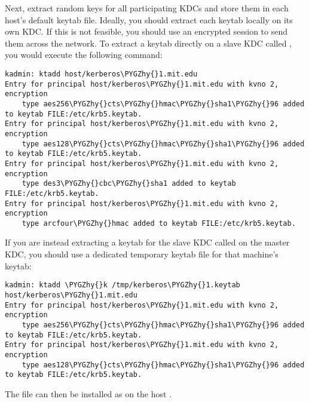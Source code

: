 \documentclass[letterpaper,10pt,english]{sphinxmanual}
\def\PYGZhy{\char`\-}
\begin{document}
Next, extract  random keys for all participating KDCs and
store them in each host's default keytab file.  Ideally, you should
extract each keytab locally on its own KDC.  If this is not feasible,
you should use an encrypted session to send them across the network.
To extract a keytab directly on a slave KDC called
, you would execute the following command:

\begin{Verbatim}[commandchars=\\\{\}]
kadmin: ktadd host/kerberos\PYGZhy{}1.mit.edu
Entry for principal host/kerberos\PYGZhy{}1.mit.edu with kvno 2, encryption
    type aes256\PYGZhy{}cts\PYGZhy{}hmac\PYGZhy{}sha1\PYGZhy{}96 added to keytab FILE:/etc/krb5.keytab.
Entry for principal host/kerberos\PYGZhy{}1.mit.edu with kvno 2, encryption
    type aes128\PYGZhy{}cts\PYGZhy{}hmac\PYGZhy{}sha1\PYGZhy{}96 added to keytab FILE:/etc/krb5.keytab.
Entry for principal host/kerberos\PYGZhy{}1.mit.edu with kvno 2, encryption
    type des3\PYGZhy{}cbc\PYGZhy{}sha1 added to keytab FILE:/etc/krb5.keytab.
Entry for principal host/kerberos\PYGZhy{}1.mit.edu with kvno 2, encryption
    type arcfour\PYGZhy{}hmac added to keytab FILE:/etc/krb5.keytab.
\end{Verbatim}

If you are instead extracting a keytab for the slave KDC called
 on the master KDC, you should use a dedicated
temporary keytab file for that machine's keytab:

\begin{Verbatim}[commandchars=\\\{\}]
kadmin: ktadd \PYGZhy{}k /tmp/kerberos\PYGZhy{}1.keytab host/kerberos\PYGZhy{}1.mit.edu
Entry for principal host/kerberos\PYGZhy{}1.mit.edu with kvno 2, encryption
    type aes256\PYGZhy{}cts\PYGZhy{}hmac\PYGZhy{}sha1\PYGZhy{}96 added to keytab FILE:/etc/krb5.keytab.
Entry for principal host/kerberos\PYGZhy{}1.mit.edu with kvno 2, encryption
    type aes128\PYGZhy{}cts\PYGZhy{}hmac\PYGZhy{}sha1\PYGZhy{}96 added to keytab FILE:/etc/krb5.keytab.
\end{Verbatim}

The file  can then be installed as
 on the host .
\end{document}
